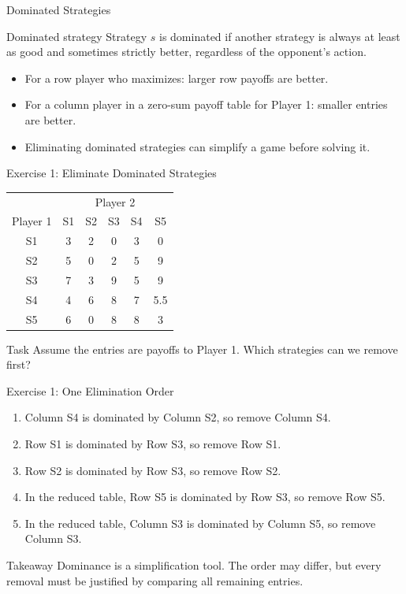 \documentclass[10pt,aspectratio=169]{beamer}
\begin{document}
\begin{frame}{Dominated Strategies}
\begin{block}{Dominated strategy}
Strategy $s$ is dominated if another strategy is always at least as good and sometimes strictly better, regardless of the opponent's action.
\end{block}
\vspace{0.2cm}
\begin{itemize}
  \item For a row player who maximizes: larger row payoffs are better.
  \item For a column player in a zero-sum payoff table for Player 1: smaller entries are better.
  \item Eliminating dominated strategies can simplify a game before solving it.
\end{itemize}
\end{frame}

\begin{frame}{Exercise 1: Eliminate Dominated Strategies}
\begin{center}
\begin{tabular}{c c c c c c}
 & \multicolumn{5}{c}{Player 2}\\
Player 1 & S1 & S2 & S3 & S4 & S5\\
\midrule
S1 & 3 & 2 & 0 & 3 & 0\\
S2 & 5 & 0 & 2 & 5 & 9\\
S3 & 7 & 3 & 9 & 5 & 9\\
S4 & 4 & 6 & 8 & 7 & 5.5\\
S5 & 6 & 0 & 8 & 8 & 3\\
\end{tabular}
\end{center}
\vspace{0.2cm}
\begin{block}{Task}
Assume the entries are payoffs to Player 1. Which strategies can we remove first?
\end{block}
\end{frame}

\begin{frame}{Exercise 1: One Elimination Order}
\begin{enumerate}
  \item Column S4 is dominated by Column S2, so remove Column S4.
  \item Row S1 is dominated by Row S3, so remove Row S1.
  \item Row S2 is dominated by Row S3, so remove Row S2.
  \item In the reduced table, Row S5 is dominated by Row S3, so remove Row S5.
  \item In the reduced table, Column S3 is dominated by Column S5, so remove Column S3.
\end{enumerate}
\vspace{0.2cm}
\begin{block}{Takeaway}
Dominance is a simplification tool. The order may differ, but every removal must be justified by comparing all remaining entries.
\end{block}
\end{frame}
\end{document}
